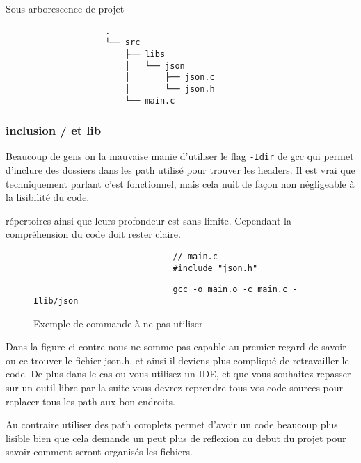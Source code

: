 			\begin{cbox}{Sous arborescence de projet}
				\begin{verbatim}
					.
					└── src
					    ├── libs
					    │   └── json
					    │       ├── json.c
					    │       └── json.h
					    └── main.c
				\end{verbatim}
			\end{cbox}

		\subsubsection{inclusion / et lib}
			Beaucoup de gens on la mauvaise manie d'utiliser le flag \verb+-Idir+ de gcc qui permet d'inclure des dossiers dans les path utilisé pour trouver les headers. Il est vrai que techniquement parlant c'est fonctionnel, mais cela nuit de façon non négligeable à la lisibilité du code.

			répertoires ainsi que leurs profondeur est sans limite. Cependant la compréhension du code doit rester claire.

			\begin{figure}[H]
				\begin{changemargin}{-2.5cm}{-2.5cm}
					\begin{tcolorbox}
						\begin{verbatim}
							// main.c
							#include "json.h"
						\end{verbatim}
					\end{tcolorbox}
					\begin{tcolorbox}
						\begin{verbatim}
							gcc -o main.o -c main.c -Ilib/json
						\end{verbatim}
					\end{tcolorbox}
				\end{changemargin}
				\caption{Exemple de commande à ne pas utiliser}
			\end{figure}

			Dans la figure ci contre nous ne somme pas capable au premier regard de savoir ou ce trouver le fichier json.h, et ainsi il deviens plus compliqué de retravailler le code. De plus dans le cas ou vous utilisez un IDE, et que vous souhaitez repasser sur un outil libre par la suite vous devrez reprendre tous vos code sources pour replacer tous les path aux bon endroits.

			Au contraire utiliser des path complets permet d'avoir un code beaucoup plus lisible bien que cela demande un peut plus de reflexion au debut du projet pour savoir comment seront organisés les fichiers.

